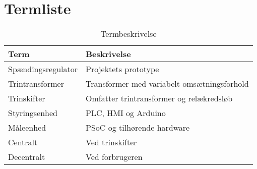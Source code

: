 

\section{Termliste}

\begin{table}[htbp]
	\centering
	\begin{tabular}{|l|l|}
		\hline
		\textbf{Term} 	& \textbf{Beskrivelse} \\\hline
		Spændingsregulator	& Projektets prototype \\\hline
		Trintransformer	& Transformer med variabelt omsætningsforhold \\\hline
		Trinskifter	& Omfatter trintransformer og relækredsløb  \\\hline
		Styringsenhed	& PLC, HMI og Arduino \\\hline
		Måleenhed	& PSoC og tilhørende hardware \\\hline
		Centralt	& Ved trinskifter \\\hline
		Decentralt 	& Ved forbrugeren \\\hline
		
	\end{tabular}
	\caption{Termbeskrivelse}
	\label{tab:termbeskrivelsen}
	
\end{table}